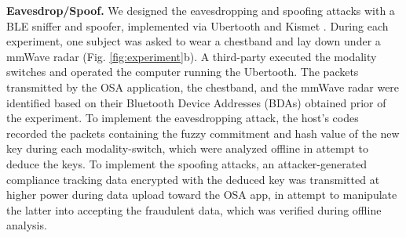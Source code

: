 

\textbf{Eavesdrop/Spoof.} We designed the eavesdropping and spoofing attacks with a BLE sniffer and spoofer, implemented via Ubertooth and Kismet \cite{technologies7010015}. During each experiment, one subject was asked to wear a chestband and lay down under a mmWave radar (Fig. \ref{fig:experiment}b). A third-party executed the modality switches and operated the computer running the Ubertooth. The packets transmitted by the OSA application, the chestband, and the mmWave radar were identified based on their Bluetooth Device Addresses (BDAs) obtained prior of the experiment. To implement the eavesdropping attack, the host's codes recorded the packets containing the fuzzy commitment and hash value of the new key during each modality-switch, which were analyzed offline in attempt to deduce the keys. To implement the spoofing attacks, an attacker-generated compliance tracking data encrypted with the deduced key was transmitted at higher power during data upload toward the OSA app, in attempt to manipulate the latter into accepting the fraudulent data, which was verified during offline analysis.

